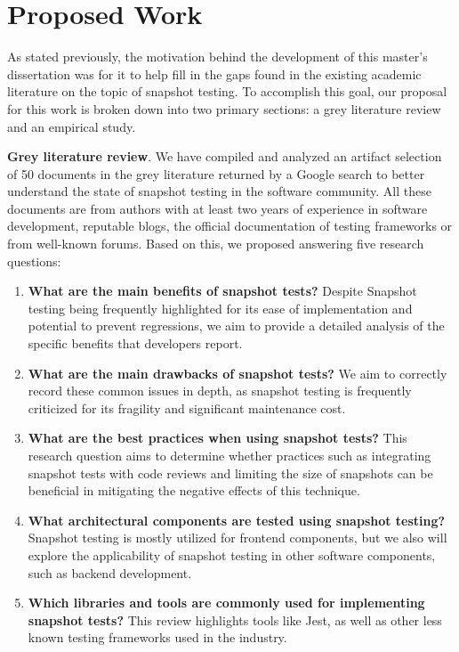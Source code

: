 \documentclass[
	msc, %
	english %
]{../ppgccufmg}
\begin{document}
	\section{Proposed Work}\label{sec:ch1-proposed-work}
        \noindent As stated previously, the motivation behind the development of this master's dissertation was for it to help fill in the gaps found in the existing academic literature on the topic of snapshot testing. To accomplish this goal, our proposal for this work is broken down into two primary sections: a grey literature review and an empirical study.

        \noindent\textbf{Grey literature review}. We have compiled and analyzed an artifact selection of 50 documents in the grey literature returned by a Google search to better understand the state of snapshot testing in the software community. All these documents are from authors with at least two years of experience in software development, reputable blogs, the official documentation of testing frameworks or from well-known forums. Based on this, we proposed answering five research questions:

        \begin{enumerate}
            \item \textbf{What are the main benefits of snapshot tests?} Despite Snapshot testing being frequently highlighted for its ease of implementation and potential to prevent regressions, we aim to provide a detailed analysis of the specific benefits that developers report.
            \item \textbf{What are the main drawbacks of snapshot tests?}
            We aim to correctly record these common issues in depth, as snapshot testing is frequently criticized for its fragility and significant maintenance cost.
            \item \textbf{What are the best practices when using snapshot tests?} This research question aims to determine whether practices such as integrating snapshot tests with code reviews and limiting the size of snapshots can be beneficial in mitigating the negative effects of this technique.
            \item \textbf{What architectural components are tested using snapshot testing?} Snapshot testing is mostly utilized for frontend components, but we also will explore the applicability of snapshot testing in other software components, such as backend development.
            \item \textbf{Which libraries and tools are commonly used for implementing snapshot tests?} This review highlights tools like Jest, as well as other less known testing frameworks used in the industry.
        \end{enumerate}
\end{document}
